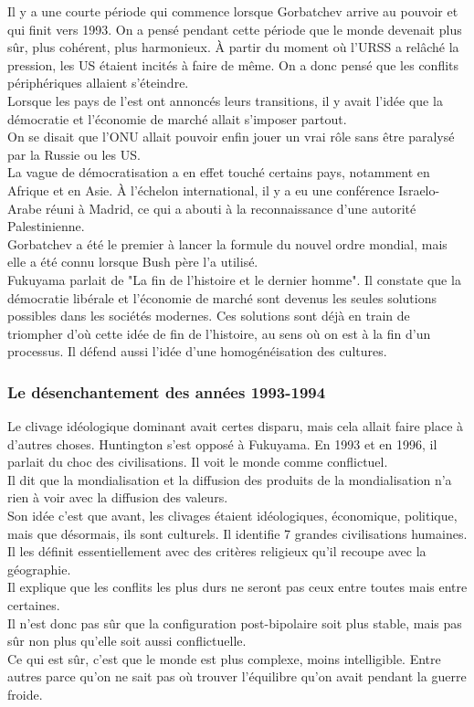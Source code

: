\documentclass[10pt, a4paper, openany]{book}
\begin{document}
Il y a une courte période qui commence lorsque Gorbatchev arrive au pouvoir et qui finit vers 1993. On a pensé pendant cette période que le monde devenait plus sûr, plus cohérent, plus harmonieux. À partir du moment où l'URSS a relâché la pression, les US étaient incités à faire de même. On a donc pensé que les conflits périphériques allaient s'éteindre. \\
Lorsque les pays de l'est ont annoncés leurs transitions, il y avait l'idée que la démocratie et l'économie de marché allait s'imposer partout. \\
On se disait que l'ONU allait pouvoir enfin jouer un vrai rôle sans être paralysé par la Russie ou les US. \\
La vague de démocratisation a en effet touché certains pays, notamment en Afrique et en Asie. À l'échelon international, il y a eu une conférence Israelo-Arabe réuni à Madrid, ce qui a abouti à la reconnaissance d'une autorité Palestinienne. \\
Gorbatchev a été le premier à lancer la formule du nouvel ordre mondial, mais elle a été connu lorsque Bush père l'a utilisé. \\
Fukuyama parlait de "La fin de l'histoire et le dernier homme". Il constate que la démocratie libérale et l'économie de marché sont devenus les seules solutions possibles dans les sociétés modernes. Ces solutions sont déjà en train de triompher d'où cette idée de fin de l'histoire, au sens où on est à la fin d'un processus. Il défend aussi l'idée d'une homogénéisation des cultures.

\subsubsection{Le désenchantement des années 1993-1994}

Le clivage idéologique dominant avait certes disparu, mais cela allait faire place à d'autres choses. Huntington s'est opposé à Fukuyama. En 1993 et en 1996, il parlait du choc des civilisations. Il voit le monde comme conflictuel. \\
Il dit que la mondialisation et la diffusion des produits de la mondialisation n'a rien à voir avec la diffusion des valeurs. \\
Son idée c'est que avant, les clivages étaient idéologiques, économique, politique, mais que désormais, ils sont culturels. Il identifie 7 grandes civilisations humaines. Il les définit essentiellement avec des critères religieux qu'il recoupe avec la géographie. \\
Il explique que les conflits les plus durs ne seront pas ceux entre toutes mais entre certaines. \\
Il n'est donc pas sûr que la configuration post-bipolaire soit plus stable, mais pas sûr non plus qu'elle soit aussi conflictuelle. \\
Ce qui est sûr, c'est que le monde est plus complexe, moins intelligible. Entre autres parce qu'on ne sait pas où trouver l'équilibre qu'on avait pendant la guerre froide. 
\end{document}
